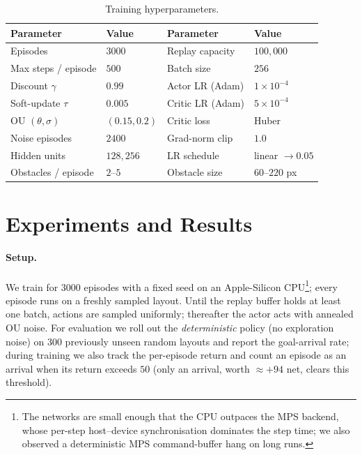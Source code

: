 \documentclass[11pt,a4paper]{article}
\newcommand{\NumEpisodes}{3000}
\newcommand{\NoiseEpisodes}{2400}
\newcommand{\EvalN}{300}
\begin{document}
\begin{table}[H]
  \centering
  \caption{Training hyperparameters.}
  \label{tab:hp}
  \begin{tabular}{llll}
    \toprule
    Parameter & Value & Parameter & Value\\
    \midrule
    Episodes              & $\NumEpisodes$ & Replay capacity   & $100{,}000$\\
    Max steps / episode   & $500$        & Batch size        & $256$\\
    Discount $\gamma$     & $0.99$       & Actor LR (Adam)   & $1\!\times\!10^{-4}$\\
    Soft-update $\tau$    & $0.005$      & Critic LR (Adam)  & $5\!\times\!10^{-4}$\\
    OU $(\theta,\sigma)$  & $(0.15,0.2)$ & Critic loss       & Huber\\
    Noise episodes        & $\NoiseEpisodes$ & Grad-norm clip    & $1.0$\\
    Hidden units          & $128, 256$   & LR schedule       & linear $\to 0.05$\\
    Obstacles / episode   & $2$--$5$     & Obstacle size     & $60$--$220$ px\\
    \bottomrule
  \end{tabular}
\end{table}

\section{Experiments and Results}
\paragraph{Setup.}
We train for \NumEpisodes{} episodes with a fixed seed on an Apple-Silicon
CPU\footnote{The networks are small enough that the CPU outpaces the MPS
backend, whose per-step host--device synchronisation dominates the step time;
we also observed a deterministic MPS command-buffer hang on long runs.};
every episode runs on a freshly sampled layout. Until the replay buffer holds at
least one batch, actions are sampled uniformly; thereafter the actor acts with
annealed OU noise. For evaluation we roll out the \emph{deterministic} policy
(no exploration noise) on \EvalN{} previously unseen random layouts and report
the goal-arrival rate; during training we also track the per-episode return
and count an episode as an arrival when its return exceeds $50$ (only an
arrival, worth $\approx +94$ net, clears this threshold).
\end{document}
